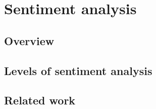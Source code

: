 \chapter{Sentiment analysis}
\label{chap:sentiment-analysis}


\section{Overview}
\label{sec:overview}

\section{Levels of sentiment analysis}
\label{sec:levels-sentiment-analysis}

\section{Related work}
\label{sec:related-work}

